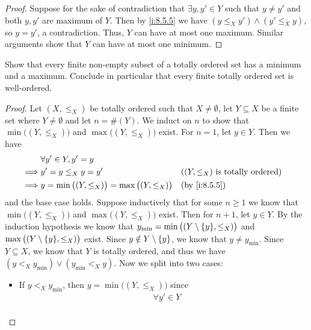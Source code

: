 \begin{proof}
  Suppose for the sake of contradiction that \(\exists y, y' \in Y\) such that \(y \neq y'\) and both \(y, y'\) are maximum of \(Y\).
  Then by \cref{i:8.5.5} we have \((y \leq_X y') \land (y' \leq_X y)\), so \(y = y'\), a contradiction.
  Thus, \(Y\) can have at most one maximum.
  Similar arguments show that \(Y\) can have at most one minimum.
\end{proof}

\begin{ex}\label{i:ex:8.5.8}
  Show that every finite non-empty subset of a totally ordered set has a minimum and a maximum.
  Conclude in particular that every finite totally ordered set is well-ordered.
\end{ex}

\begin{proof}
  Let \((X, \leq_X)\) be totally ordered such that \(X \neq \emptyset\), let \(Y \subseteq X\) be a finite set where \(Y \neq \emptyset\) and let \(n = \#(Y)\).
  We induct on \(n\) to show that \(\min\big((Y, \leq_X)\big)\) and \(\max\big((Y, \leq_X)\big)\) exist.
  For \(n = 1\), let \(y \in Y\).
  Then we have
  \begin{align*}
             & \forall y' \in Y, y' = y                                                                                   \\
    \implies & y' = y \leq_X y = y'                                      &  & \text{(\((Y, \leq_X)\) is totally ordered)} \\
    \implies & y = \min\big((Y, \leq_X)\big) = \max\big((Y, \leq_X)\big) &  & \by{i:8.5.5}
  \end{align*}
  and the base case holds.
  Suppose inductively that for some \(n \geq 1\) we know that \(\min\big((Y, \leq_X)\big)\) and \(\max\big((Y, \leq_X)\big)\) exist.
  Then for \(n + 1\), let \(y \in Y\).
  By the induction hypothesis we know that \(y_{\min} = \min\big((Y \setminus \set{y}, \leq_X)\big)\) and \(\max\big((Y \setminus \set{y}, \leq_X)\big)\) exist.
  Since \(y \notin Y \setminus \left\lbrace y\right\rbrace\), we know that \(y \neq y_{\min}\).
  Since \(Y \subseteq X\), we know that \(Y\) is totally ordered, and thus we have \((y <_X y_{\min}) \lor (y_{\min} <_X y)\).
  Now we split into two cases:
  \begin{itemize}
    \item If \(y <_X y_{\min}\), then \(y = \min\big((Y, \leq_X)\big)\) since
          \begin{align*}
                     & \forall y' \in Y                                                                       \\

\end{align*}
\end{itemize}
\end{proof}
